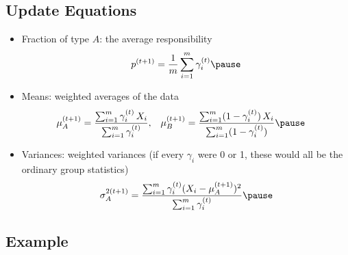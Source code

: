 \begin{slide}
\section[-2]{Update Equations}

\begin{PauseHighLight}
  \begin{itemize}
  \item Fraction of type $A$: the average responsibility
    \begin{align*}
      p^{(t+1)} = \frac{1}{m} \sum_{i=1}^m \gamma_i^{(t)}\pause
    \end{align*}
  \item Means: weighted averages of the data
    \begin{align*}
      \mu_A^{(t+1)}
      &= \frac{ \sum_{i=1}^m \gamma_i^{(t)}\, X_i}
        {\sum_{i=1}^m \gamma_i^{(t)}}, &
      \mu_B^{(t+1)}
      &= \frac{ \sum_{i=1}^m (1-\gamma_i^{(t)})\, X_i}
        {\sum_{i=1}^m (1-\gamma_i^{(t)})}\pause
    \end{align*}
  \item Variances: weighted variances (if every $\gamma_i$ were 0 or 1,
    these would all be the ordinary group statistics)
  \begin{align*}
    \sigma_A^{2(t+1)}
      = \frac{ \sum_{i=1}^m \gamma_i^{(t)}
        (X_i-\mu^{(t+1)}_A)^2}
        {\sum_{i=1}^m \gamma_i^{(t)}}\pause
  \end{align*}
  \end{itemize}
\end{PauseHighLight}

\end{slide}


\begin{slide}
\section{Example}
\pause
\pb{}
\begin{center}
  \pause
\end{center}
\end{slide}


